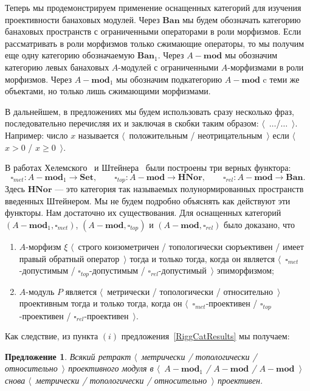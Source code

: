 \documentclass[12pt]{article}
\numberwithin{equation}{subsection}
\theoremstyle{plain}
\newtheorem{proposition}{Предложение}
\begin{document}
\begin{fulltext}
Теперь мы продемонстрируем применение оснащенных категорий для изучения
проективности банаховых модулей.  Через $\mathbf{Ban}$ мы будем обозначать
категорию банаховых пространств с ограниченными операторами в роли морфизмов.
Если рассматривать в роли морфизмов только сжимающие операторы, то мы получим
еще одну категорию обозначаемую $\mathbf{Ban}_1$. Через $A-\mathbf{mod}$ мы
обозначим категорию левых банаховых $A$-модулей с ограниченными $A$-морфизмами в
роли морфизмов. Через $A-\mathbf{mod}_1$ мы обозначим подкатегорию
$A-\mathbf{mod}$ c теми же объектами, но только лишь сжимающими морфизмами. 

В дальнейшем, в предложениях мы будем использовать сразу несколько фраз,
последовательно перечисляя их и заключая в скобки таким образом:
$\langle$~$\ldots$/$\ldots$~$\rangle$. Например: число $x$ называется
$\langle$~положительным / неотрицательным~$\rangle$ если $\langle$~$x>0$ /
$x\geq 0$~$\rangle$.

В работах Хелемского~\cite{HelMetrFrQMod} и 
Штейнера~\cite{ShtTopFrClassicQuantMod} были построены три верных функтора:
$$
\square_{met}:A-\mathbf{mod}_1\to\mathbf{Set},\qquad
\square_{top}:A-\mathbf{mod}\to\mathbf{HNor},\qquad
\square_{rel}:A-\mathbf{mod}\to\mathbf{Ban}.
$$
Здесь $\mathbf{HNor}$ --- это категория так называемых полунормированных
пространств введенных Штейнером. Мы не будем подробно объяснять как действуют
эти функторы. Нам достаточно их существования. Для оснащенных категорий
$(A-\mathbf{mod}_1,\square_{met})$, $(A-\mathbf{mod},\square_{top})$ и
$(A-\mathbf{mod},\square_{rel})$ было доказано, что 
\begin{enumerate}[label = (\roman*)]
    \item $A$-морфизм $\xi$ $\langle$~строго коизометричен / топологически
    сюръективен / имеет правый обратный оператор~$\rangle$ тогда и только тогда,
    когда он является $\langle$~$\square_{met}$-допустимым / $\square_{top}$-допустимым /
    $\square_{rel}$-допустимый~$\rangle$ эпиморфизмом;

    \item $A$-модуль $P$ является $\langle$~метрически / топологически /
    относительно~$\rangle$ проективным тогда и только тогда, когда он
    $\langle$~$\square_{met}$-проективен / $\square_{top}$-проективен /
    $\square_{rel}$-проективен~$\rangle$.
\end{enumerate}

Как следствие, из пункта $(i)$ предложения~\ref{RiggCatResults} мы получаем:

\begin{proposition}\label{RetrMetTopProjIsMetTopProj} Всякий ретракт
$\langle$~метрически / топологически / относительно~$\rangle$ проективного
модуля в $\langle$~$A-\mathbf{mod}_1$ / $A-\mathbf{mod}$ /
$A-\mathbf{mod}$~$\rangle$ снова $\langle$~метрически / топологически /
относительно~$\rangle$ проективен.
\end{proposition}


\end{fulltext}
\end{document}
